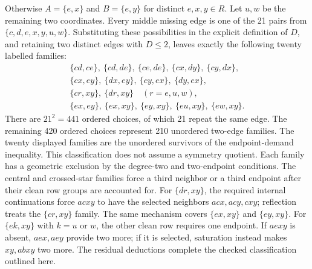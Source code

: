 \documentclass[11pt,a4paper]{article}
\theoremstyle{definition}
\theoremstyle{remark}
\begin{document}
Otherwise $A=\{e,x\}$ and $B=\{e,y\}$ for distinct $e,x,y\in R$.
Let $u,w$ be the remaining two coordinates. Every middle missing edge
is one of the 21 pairs from $\{c,d,e,x,y,u,w\}$. Substituting these
possibilities in the explicit definition of $D$, and retaining two
distinct edges with $D\le2$, leaves exactly the following twenty
labelled families:
\[
\begin{gathered}
 \{cd,ce\},\ \{cd,de\},\ \{ce,de\},\ \{cx,dy\},\ \{cy,dx\},\\
 \{cx,ey\},\ \{dx,ey\},\ \{cy,ex\},\ \{dy,ex\},\\
 \{cr,xy\},\ \{dr,xy\}\quad(r=e,u,w),\\
 \{ex,ey\},\ \{ex,xy\},\ \{ey,xy\},\ \{eu,xy\},\ \{ew,xy\}.
\end{gathered}
\]
There are $21^2=441$ ordered choices, of which 21 repeat the same edge. The remaining 420 ordered choices represent 210 unordered two-edge families. The twenty displayed families are the unordered survivors of the endpoint-demand inequality. This classification does not assume a symmetry quotient. Each
family has a geometric exclusion by the degree-two and two-endpoint
conditions. The central and crossed-star families force a third neighbor
or a third endpoint after their clean row groups are accounted for.
For $\{dr,xy\}$, the required internal continuations force $acxy$ to
have the selected neighbors $acx,acy,cxy$; reflection treats the
$\{cr,xy\}$ family. The same mechanism covers $\{ex,xy\}$ and
$\{ey,xy\}$. For $\{ek,xy\}$ with $k=u$ or $w$, the other clean row
requires one endpoint. If $aexy$ is absent, $aex,aey$ provide two more;
if it is selected, saturation instead makes $xy,abxy$ two more.
The residual deductions complete the checked classification outlined here.
\end{document}
